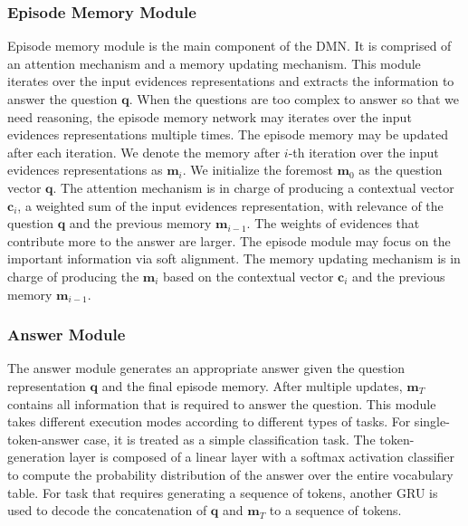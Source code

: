 \documentclass[conference]{IEEEtran}
\begin{document}
	\subsubsection{Episode Memory Module}
	Episode memory module is the main component of the DMN. It is comprised of an attention mechanism and a memory updating mechanism. This module iterates over the input evidences representations and extracts the information to answer the question $\mathbf{q}$. When the questions are too complex to answer so that we need reasoning, the episode memory network may iterates over the input evidences representations multiple times. The episode memory may be updated after each iteration. We denote the memory after $i$-th iteration over the input evidences representations as $\mathbf{m}_i$. We initialize the foremost $\mathbf{m}_0$ as the question vector $\mathbf{q}$. The attention mechanism is in charge of producing a contextual vector $\mathbf{c}_i$, a weighted sum of the input evidences representation, with relevance of the question $\mathbf{q}$ and the previous memory $\mathbf{m}_{i-1}$. The weights of evidences that contribute more to the answer are larger. The episode module may focus on the important information via soft alignment. The memory updating mechanism is in charge of producing the $\mathbf{m}_i$ based on the contextual vector $\mathbf{c}_i$ and the previous memory $\mathbf{m}_{i-1}$. 
	\subsubsection{Answer Module}
	The answer module generates an appropriate answer given the question representation $\mathbf{q}$ and the final episode memory. After multiple updates, $\mathbf{m}_{T}$ contains all information that is required to answer the question. This module takes different execution modes according to different types of tasks. For single-token-answer case, it is treated as a simple classification task. The token-generation layer is composed of a linear layer with a softmax activation classifier to compute the probability distribution of the answer over the entire vocabulary table. For task that requires generating a sequence of tokens, another GRU is used to decode the concatenation of $\mathbf{q}$ and $\mathbf{m}_T$ to a sequence of tokens.
	
\end{document}
